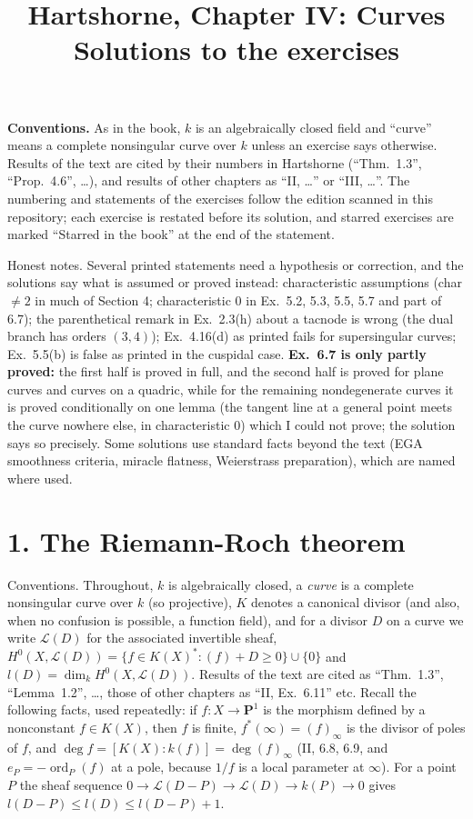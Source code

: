 \documentclass[11pt]{article}
\title{Hartshorne, Chapter IV: Curves\\[2pt]\large Solutions to the exercises}
\author{}
\date{}
\begin{document}
\maketitle
\noindent\textbf{Conventions.} As in the book, $k$ is an algebraically closed field and ``curve'' means a complete nonsingular curve over $k$ unless an exercise says otherwise. Results of the text are cited by their numbers in Hartshorne (``Thm.~1.3'', ``Prop.~4.6'', \dots), and results of other chapters as ``II, \dots'' or ``III, \dots''. The numbering and statements of the exercises follow the edition scanned in this repository; each exercise is restated before its solution, and starred exercises are marked ``Starred in the book'' at the end of the statement.

Honest notes. Several printed statements need a hypothesis or correction, and the solutions say what is assumed or proved instead: characteristic assumptions (char $\neq2$ in much of Section 4; characteristic $0$ in Ex.~5.2, 5.3, 5.5, 5.7 and part of 6.7); the parenthetical remark in Ex.~2.3(h) about a tacnode is wrong (the dual branch has orders $(3,4)$); Ex.~4.16(d) as printed fails for supersingular curves; Ex.~5.5(b) is false as printed in the cuspidal case. \textbf{Ex.~6.7 is only partly proved:} the first half is proved in full, and the second half is proved for plane curves and curves on a quadric, while for the remaining nondegenerate curves it is proved conditionally on one lemma (the tangent line at a general point meets the curve nowhere else, in characteristic $0$) which I could not prove; the solution says so precisely. Some solutions use standard facts beyond the text (EGA smoothness criteria, miracle flatness, Weierstrass preparation), which are named where used.

\section*{1. The Riemann-Roch theorem}

Conventions. Throughout, $k$ is algebraically closed, a \emph{curve} is a complete nonsingular curve over $k$ (so projective), $K$ denotes a canonical divisor (and also, when no confusion is possible, a function field), and for a divisor $D$ on a curve we write $\mathcal L(D)$ for the associated invertible sheaf, $H^0(X,\mathcal L(D))=\{f\in K(X)^*:(f)+D\ge0\}\cup\{0\}$ and $l(D)=\dim_kH^0(X,\mathcal L(D))$. Results of the text are cited as ``Thm.~1.3'', ``Lemma~1.2'', \dots, those of other chapters as ``II, Ex.~6.11'' etc. Recall the following facts, used repeatedly: if $f:X\to\mathbf P^1$ is the morphism defined by a nonconstant $f\in K(X)$, then $f$ is finite, $f^*(\infty)=(f)_\infty$ is the divisor of poles of $f$, and $\deg f=[K(X):k(f)]=\deg (f)_\infty$ (II, 6.8, 6.9, and $e_P=-\operatorname{ord}_P(f)$ at a pole, because $1/f$ is a local parameter at $\infty$). For a point $P$ the sheaf sequence $0\to\mathcal L(D-P)\to\mathcal L(D)\to k(P)\to0$ gives $l(D-P)\le l(D)\le l(D-P)+1$.
\end{document}
